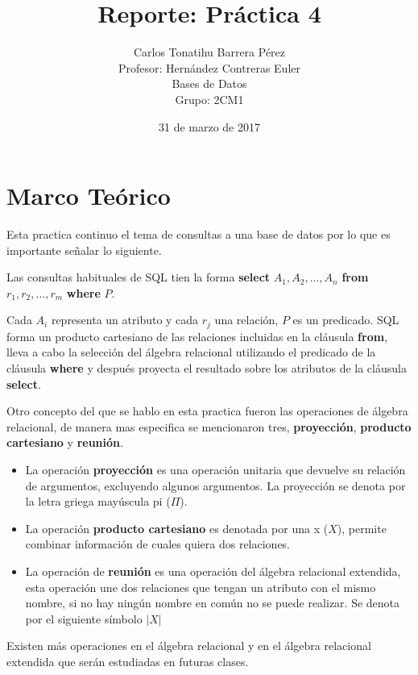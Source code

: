 \documentclass[12pt, titlepage]{article}
\title{Reporte: Práctica 4}
\author{Carlos Tonatihu Barrera Pérez \\ Profesor: Hernández Contreras Euler \\ Bases de Datos \\ Grupo: 2CM1 }
\date{31 de marzo de 2017}
\begin{document}
\maketitle
\tableofcontents
\section{Marco Teórico}
Esta practica continuo el tema de consultas a una base de datos por lo que es importante señalar lo siguiente.

Las consultas habituales de SQL tien la forma \textbf{select} $A_{1}, A_{2},...,A_{n}$ \textbf{from} $r_{1}, r_{2}, ..., r_{m}$ \textbf{where} $P$.\cite{LIBRO}

Cada $A_{i}$ representa un atributo y cada $r_{j}$ una relación, $P$ es un predicado. SQL forma un producto cartesiano de las relaciones incluidas en la cláusula \textbf{from}, lleva a cabo la selección del álgebra relacional utilizando el predicado de la cláusula \textbf{where} y después proyecta el resultado sobre los atributos de la cláusula \textbf{select}.

Otro concepto del que se hablo en esta practica fueron las operaciones de álgebra relacional, de manera mas especifica se mencionaron tres, \textbf{proyección}, \textbf{producto cartesiano} y \textbf{reunión}.\cite{LIBRO}
\begin{itemize}
	\item La operación \textbf{proyección} es una operación unitaria que devuelve su relación de argumentos, excluyendo algunos argumentos. La proyección se denota por la letra griega mayúscula pi ($\Pi$).
	\item La operación \textbf{producto cartesiano} es denotada por una x ($X$), permite combinar información de cuales quiera dos relaciones.
	\item La operación de \textbf{reunión} es una operación del álgebra relacional extendida, esta operación une dos relaciones que tengan un atributo con el mismo nombre, si no hay ningún nombre en común no se puede realizar. Se denota por el siguiente símbolo $|X|$
\end{itemize}
Existen más operaciones en el álgebra relacional y en el álgebra relacional extendida que serán estudiadas en futuras clases.
\newpage
\end{document}
